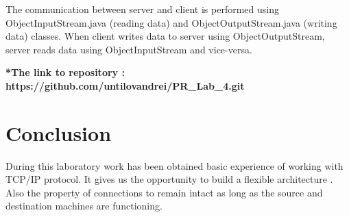 \documentclass[12pt]{article}
\begin{document}
	The communication between server and client is performed using ObjectInputStream.java (reading data) and ObjectOutputStream.java (writing data) classes.  When client writes data to server using ObjectOutputStream, server reads data using ObjectInputStream and vice-versa.
	
	
	\begin{center}
		\textbf{*The link to repository : https://github.com/untilovandrei/PR\_Lab\_4.git}
	\end{center}
	
	
	\newpage
	\section{Conclusion}
	During this laboratory work has been obtained basic experience of working with TCP/IP protocol. It gives us the opportunity to build a flexible architecture . Also the property of  connections to remain intact as long as the source and destination machines are functioning.
	
	
	
	
\end{document}
